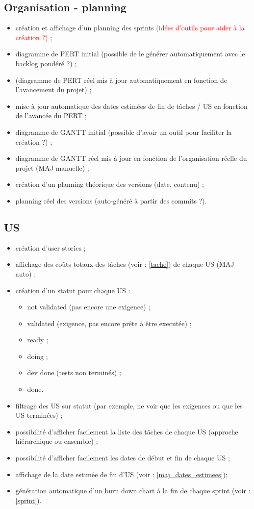 \subsection{Organisation - planning}
\begin{itemize}
\item cr\'eation et affichage d'un planning des sprints\label{sprint} \textcolor{red}{(id\'ees d'outils pour aider \`a la cr\'eation ?)} ;
\item diagramme de PERT initial (possible de le g\'en\'erer automatiquement avec le backlog pond\'er\'e ?) ;
\item (diagramme de PERT r\'eel mis \`a jour automatiquement en fonction de l'avancement du projet) ;
\item mise \`a jour automatique des dates estim\'ees de fin de t\^aches / US en fonction de l'avanc\'ee du PERT\label{maj_dates_estimees} ;
\item diagramme de GANTT initial (possible d'avoir un outil pour faciliter la cr\'eation ?) ;
\item diagramme de GANTT r\'eel mis \`a jour en fonction de l'organisation r\'eelle du projet (MAJ manuelle) ;
\item cr\'eation d'un planning th\'eorique des versions (date, contenu) ;
\item planning r\'eel des versions (auto-g\'en\'er\'e \`a partir des commits ?).
\end{itemize}

\subsection{US}
\begin{itemize}
\item cr\'eation d'user stories ;
\item affichage des co\^uts totaux des t\^aches (voir : \ref{tache}) de chaque US (MAJ auto) ;
\item cr\'eation d'un statut pour chaque US :
\begin{itemize}
\item not validated (pas encore une exigence) ;
\item validated (exigence, pas encore pr\^ete \`a \^etre execut\'ee) ;
\item ready ;
\item doing ;
\item dev done (tests non termin\'es) ;
\item done.
\end{itemize}
\item filtrage des US sur statut (par exemple, ne voir que les exigences ou que les US termin\'ees) ;
\item possibilit\'e d'afficher facilement la liste des t\^aches de chaque US (approche hi\'erarchique ou ensemble) ;
\item possibilit\'e d'afficher facilement les dates de d\'ebut et fin de chaque US ;
\item affichage de la date estim\'ee de fin d'US (voir : \ref{maj_dates_estimees});
\item g\'en\'eration automatique d'un burn down chart \`a la fin de chaque sprint (voir : \ref{sprint}).
\end{itemize}

